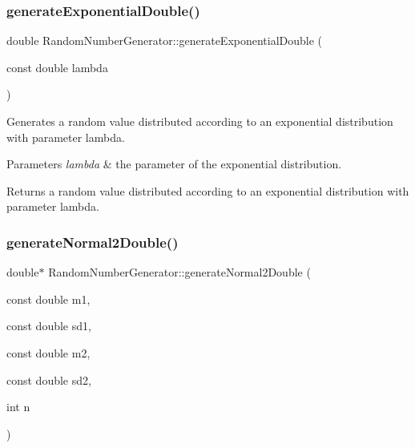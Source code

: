 \subsubsection{\texorpdfstring{generate\+Exponential\+Double()}{generateExponentialDouble()}}
{\footnotesize\ttfamily double Random\+Number\+Generator\+::generate\+Exponential\+Double (\begin{DoxyParamCaption}\item[{const double}]{lambda }\end{DoxyParamCaption})}

Generates a random value distributed according to an exponential distribution with parameter lambda. 
\begin{DoxyParams}{Parameters}
{\em lambda} & the parameter of the exponential distribution. \\
\hline
\end{DoxyParams}
\begin{DoxyReturn}{Returns}
a random value distributed according to an exponential distribution with parameter lambda. 
\end{DoxyReturn}
\mbox{\label{class_random_number_generator_a6a8cdbfdb3343a10aab18b83fc6ce0dc}} 
\subsubsection{\texorpdfstring{generate\+Normal2\+Double()}{generateNormal2Double()}}
{\footnotesize\ttfamily double$\ast$ Random\+Number\+Generator\+::generate\+Normal2\+Double (\begin{DoxyParamCaption}\item[{const double}]{m1,  }\item[{const double}]{sd1,  }\item[{const double}]{m2,  }\item[{const double}]{sd2,  }\item[{int}]{n }\end{DoxyParamCaption})}

